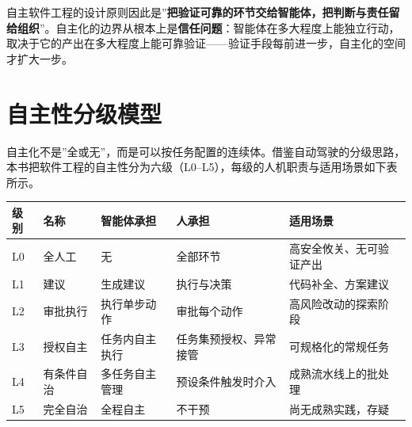 \documentclass[12pt,a4paper,twoside,openany]{ctexbook}
\numberwithin{figure}{chapter}
\numberwithin{table}{chapter}
\newcounter{none}
\begin{document}
自主软件工程的设计原则因此是''\textbf{把验证可靠的环节交给智能体，把判断与责任留给组织}''。自主化的边界从根本上是\textbf{信任问题}：智能体在多大程度上能独立行动，取决于它的产出在多大程度上能可靠验证------验证手段每前进一步，自主化的空间才扩大一步。

\section{自主性分级模型}\label{ux81eaux4e3bux6027ux5206ux7ea7ux6a21ux578b}

自主化不是''全或无''，而是可以按任务配置的连续体。借鉴自动驾驶的分级思路，本书把软件工程的自主性分为六级（L0--L5），每级的人机职责与适用场景如下表所示。

{\def\LTcaptype{none} %
\begin{longtable}[]{@{}
  >{\raggedright\arraybackslash}p{}
  >{\raggedright\arraybackslash}p{}
  >{\raggedright\arraybackslash}p{}
  >{\raggedright\arraybackslash}p{}
  >{\raggedright\arraybackslash}p{}@{}}
\toprule\noalign{}
\begin{minipage}[b]{\linewidth}\raggedright
级别
\end{minipage} & \begin{minipage}[b]{\linewidth}\raggedright
名称
\end{minipage} & \begin{minipage}[b]{\linewidth}\raggedright
智能体承担
\end{minipage} & \begin{minipage}[b]{\linewidth}\raggedright
人承担
\end{minipage} & \begin{minipage}[b]{\linewidth}\raggedright
适用场景
\end{minipage} \\
\midrule\noalign{}
\endhead
\bottomrule\noalign{}
\endlastfoot
L0 & 全人工 & 无 & 全部环节 & 高安全攸关、无可验证产出 \\
L1 & 建议 & 生成建议 & 执行与决策 & 代码补全、方案建议 \\
L2 & 审批执行 & 执行单步动作 & 审批每个动作 & 高风险改动的探索阶段 \\
L3 & 授权自主 & 任务内自主执行 & 任务集预授权、异常接管 &
可规格化的常规任务 \\
L4 & 有条件自治 & 多任务自主管理 & 预设条件触发时介入 &
成熟流水线上的批处理 \\
L5 & 完全自治 & 全程自主 & 不干预 & 尚无成熟实践，存疑 \\
\end{longtable}
}
\end{document}
